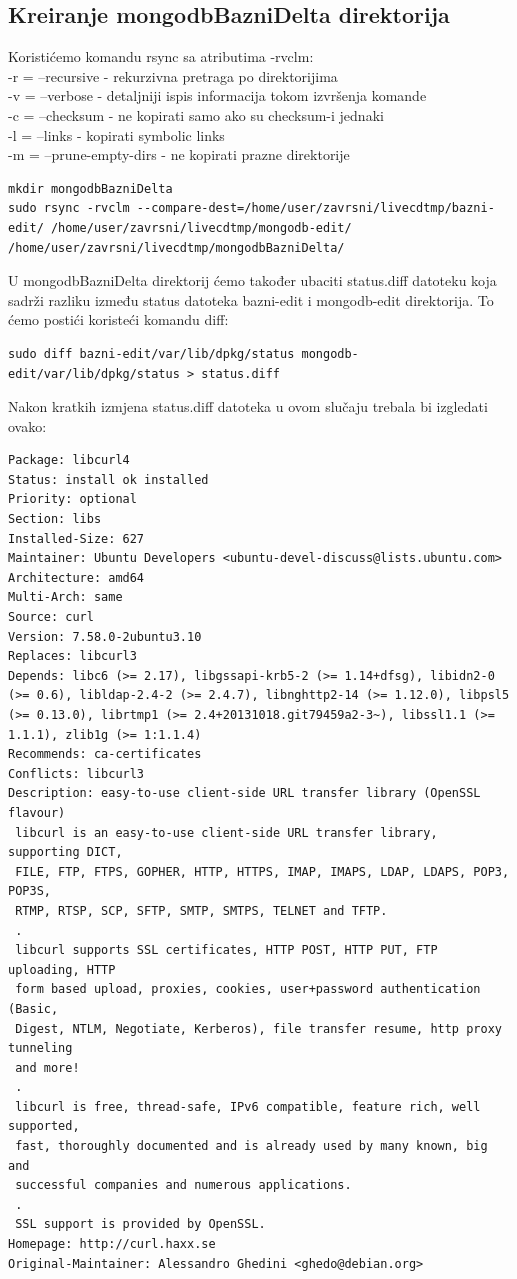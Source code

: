 \documentclass[12pt,vi]{mitthesis}
\begin{document}
\subsection*{Kreiranje mongodbBazniDelta direktorija}
\indent
Koristićemo komandu rsync sa atributima -rvclm:\\
-r = --recursive - rekurzivna pretraga po direktorijima\\
-v = --verbose - detaljniji ispis informacija tokom izvršenja komande\\
-c = --checksum - ne kopirati samo ako su checksum-i jednaki\\
-l = --links - kopirati symbolic links\\
-m = --prune-empty-dirs - ne kopirati prazne direktorije\\
\begin{lstlisting}[style=BashInputStyle]
mkdir mongodbBazniDelta
sudo rsync -rvclm --compare-dest=/home/user/zavrsni/livecdtmp/bazni-edit/ /home/user/zavrsni/livecdtmp/mongodb-edit/ /home/user/zavrsni/livecdtmp/mongodbBazniDelta/
\end{lstlisting}
\indent
U mongodbBazniDelta direktorij ćemo također ubaciti status.diff datoteku koja sadrži razliku između status datoteka bazni-edit i mongodb-edit direktorija. To ćemo postići koristeći komandu diff:
\begin{lstlisting}[style=BashInputStyle]
sudo diff bazni-edit/var/lib/dpkg/status mongodb-edit/var/lib/dpkg/status > status.diff
\end{lstlisting}
Nakon kratkih izmjena status.diff datoteka u ovom slučaju trebala bi izgledati ovako:
\begin{lstlisting}[style=BashInputStyle]
Package: libcurl4
Status: install ok installed
Priority: optional
Section: libs
Installed-Size: 627
Maintainer: Ubuntu Developers <ubuntu-devel-discuss@lists.ubuntu.com>
Architecture: amd64
Multi-Arch: same
Source: curl
Version: 7.58.0-2ubuntu3.10
Replaces: libcurl3
Depends: libc6 (>= 2.17), libgssapi-krb5-2 (>= 1.14+dfsg), libidn2-0 (>= 0.6), libldap-2.4-2 (>= 2.4.7), libnghttp2-14 (>= 1.12.0), libpsl5 (>= 0.13.0), librtmp1 (>= 2.4+20131018.git79459a2-3~), libssl1.1 (>= 1.1.1), zlib1g (>= 1:1.1.4)
Recommends: ca-certificates
Conflicts: libcurl3
Description: easy-to-use client-side URL transfer library (OpenSSL flavour)
 libcurl is an easy-to-use client-side URL transfer library, supporting DICT,
 FILE, FTP, FTPS, GOPHER, HTTP, HTTPS, IMAP, IMAPS, LDAP, LDAPS, POP3, POP3S,
 RTMP, RTSP, SCP, SFTP, SMTP, SMTPS, TELNET and TFTP.
 .
 libcurl supports SSL certificates, HTTP POST, HTTP PUT, FTP uploading, HTTP
 form based upload, proxies, cookies, user+password authentication (Basic,
 Digest, NTLM, Negotiate, Kerberos), file transfer resume, http proxy tunneling
 and more!
 .
 libcurl is free, thread-safe, IPv6 compatible, feature rich, well supported,
 fast, thoroughly documented and is already used by many known, big and
 successful companies and numerous applications.
 .
 SSL support is provided by OpenSSL.
Homepage: http://curl.haxx.se
Original-Maintainer: Alessandro Ghedini <ghedo@debian.org>
\end{lstlisting}
\end{document}
